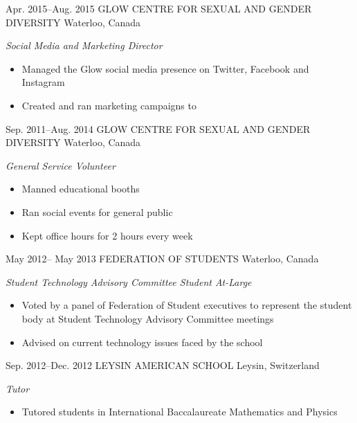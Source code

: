 \documentclass[]{friggeri-cv} %
\begin{document}
\begin{entrylist}

\entry
{Apr. 2015--Aug. 2015}
{GLOW CENTRE FOR SEXUAL AND GENDER DIVERSITY}
{Waterloo, Canada}
{\emph{Social Media and Marketing Director} \\
\begin{itemize}
	\item Managed the Glow social media presence on Twitter, Facebook and Instagram
	\item Created and ran marketing campaigns to 
\end{itemize}
}

\entry
{Sep. 2011--Aug. 2014}
{GLOW CENTRE FOR SEXUAL AND GENDER DIVERSITY}
{Waterloo, Canada}
{\emph{General Service Volunteer} \\
\begin{itemize}
	\item Manned educational booths
	\item Ran social events for general public
	\item Kept office hours for 2 hours every week
\end{itemize}
}

\entry
{May 2012-- May 2013}
{FEDERATION OF STUDENTS}
{Waterloo, Canada}
{\emph{Student Technology Advisory Committee Student At-Large} \\
\begin{itemize}
	\item Voted by a panel of Federation of Student executives to represent the student body at Student Technology Advisory Committee meetings
	\item Advised on current technology issues faced by the school
\end{itemize}
}

\entry
{Sep. 2012--Dec. 2012}
{LEYSIN AMERICAN SCHOOL}
{Leysin, Switzerland}
{\emph{Tutor} \\
\begin{itemize}
	\item Tutored students in International Baccalaureate Mathematics and Physics
\end{itemize}
}


\end{entrylist}

\end{document}
